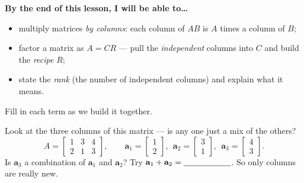 \documentclass[10pt]{article}
\begin{document}

\vspace{0.12in}

\begin{objectivebox}
\textbf{By the end of this lesson, I will be able to\dots}
\begin{itemize}\setlength{\itemsep}{2pt}
  \item multiply matrices \emph{by columns}: each column of $AB$ is $A$ times a column of $B$;
  \item factor a matrix as $A=CR$ --- pull the \emph{independent} columns into $C$ and build the \emph{recipe} $R$;
  \item state the \emph{rank} (the number of independent columns) and explain what it means.
\end{itemize}
\end{objectivebox}

\vspace{0.10in}

\begin{vocabbox}
\small
Fill in each term as we build it together.
\par\vspace{2pt}
\end{vocabbox}

\begin{hookbox}
Look at the three columns of this matrix --- is any one just a mix of the others?
\[
  A=\begin{bmatrix} 1 & 3 & 4 \\ 2 & 1 & 3 \end{bmatrix},
  \qquad
  \mathbf{a}_1=\begin{bmatrix} 1 \\ 2 \end{bmatrix},\ \
  \mathbf{a}_2=\begin{bmatrix} 3 \\ 1 \end{bmatrix},\ \
  \mathbf{a}_3=\begin{bmatrix} 4 \\ 3 \end{bmatrix}.
\]
Is $\mathbf{a}_3$ a combination of $\mathbf{a}_1$ and $\mathbf{a}_2$? Try
$\mathbf{a}_1+\mathbf{a}_2=\blank{2.0cm}$. So only \blank{1.0cm} columns are really new. \writeline
\end{hookbox}
\end{document}
